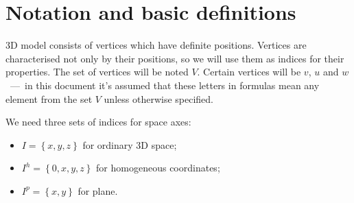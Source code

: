 \section{Notation and basic definitions}

3D model consists of vertices which have definite positions.
Vertices are characterised not only by their positions,
so we will use them as indices for their properties.
The set of vertices will be noted $V$.
Certain vertices will be $v$, $u$ and $w$~---~in this document
it's assumed that these letters in formulas
mean any element from the set $V$ unless otherwise specified.

We need three sets of indices for space axes:
\begin{itemize}
  \item $I = \left\{ x, y, z \right\}$ for ordinary 3D space;
  \item $I^h = \left\{ 0, x, y, z \right\}$ for homogeneous coordinates;
  \item $I^p = \left\{ x, y \right\}$ for plane.
\end{itemize}
